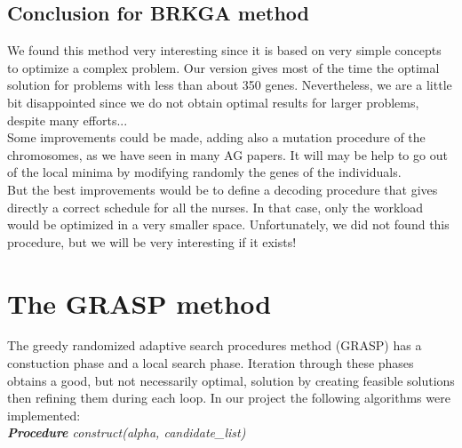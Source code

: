 \documentclass[11pt]{article}
\begin{document}
\subsection{Conclusion for BRKGA method}
We found this method very interesting since it is based on very simple concepts to optimize a complex problem. Our version gives most of the time the optimal solution for problems with less than about 350 genes. Nevertheless, we are a little bit disappointed since we do not obtain optimal results for larger problems, despite many efforts...  \\
Some improvements could be made, adding also a mutation procedure of the chromosomes, as we have seen in many AG papers. It will may be help to go out of the local minima by modifying  randomly the genes of the individuals. \\
But the best improvements would be to define a decoding procedure that gives directly a correct schedule for all the nurses. In that case, only the workload would be optimized in a very smaller space. Unfortunately, we did not found this procedure, but we will be very interesting if it exists!



\section{The GRASP method}
The greedy randomized adaptive search procedures method (GRASP) has a constuction phase and a local search phase. Iteration through these phases obtains a good, but not necessarily optimal, solution by creating feasible solutions then refining them during each loop.
In our project the following algorithms were implemented:\\

\textit{\textbf{Procedure} construct(alpha, candidate\_list)}
\end{document}
